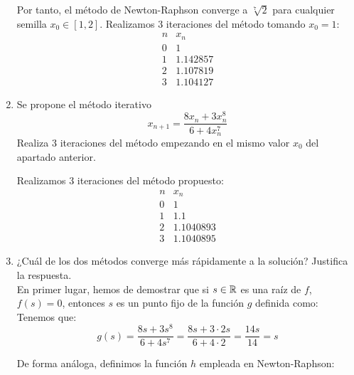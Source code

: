 \begin{ejercicio}
\begin{enumerate}
        Por tanto, el método de Newton-Raphson converge a $\sqrt[7]{2}$ para cualquier semilla $x_0\in [1, 2]$. Realizamos 3 iteraciones del método tomando $x_0=1$:
        \begin{equation*}
            \begin{array}{c|c}
                n & x_n\\ \hline
                0 & 1 \\
                1 & 1.142857\\
                2 & 1.107819\\
                3 & 1.104127
            \end{array}
        \end{equation*}
        \item Se propone el método iterativo
        \[
            x_{n+1} = \frac{8x_n + 3x_n^8}{6 + 4x_n^7}
        \]
        Realiza 3 iteraciones del método empezando en el mismo valor $x_0$ del apartado anterior.

        Realizamos 3 iteraciones del método propuesto:
        \begin{equation*}
            \begin{array}{c|c}
                n & x_n\\ \hline
                0 & 1 \\
                1 & 1.1\\
                2 & 1.1040893\\
                3 & 1.1040895
            \end{array}
        \end{equation*}
        \item ¿Cuál de los dos métodos converge más rápidamente a la solución? Justifica la respuesta.\\
        
        En primer lugar, hemos de demostrar que si $s\in \mathbb{R}$ es una raíz de $f$, $f(s)=0$, entonces $s$ es un punto fijo de la función $g$ definida como:
        Tenemos que:
        \begin{equation*}
            g(s)=\dfrac{8s + 3s^8}{6 + 4s^7} = \dfrac{8s+3\cdot 2s}{6+4\cdot 2} = \dfrac{14s}{14} = s
        \end{equation*}

        De forma análoga, definimos la función $h$ empleada en Newton-Raphson:


\end{enumerate}
\end{ejercicio}
